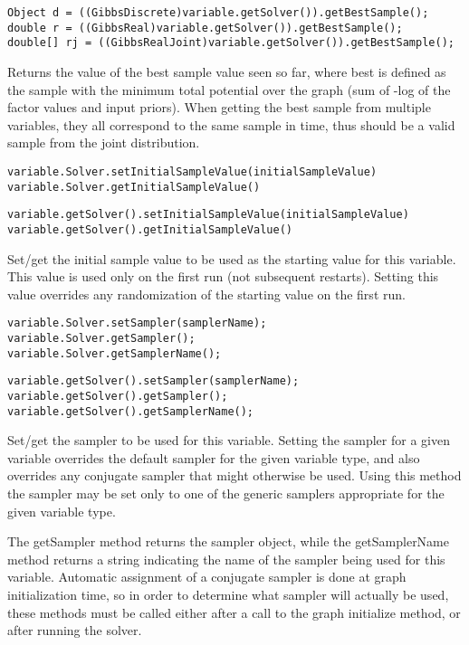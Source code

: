 \ifjava
\begin{lstlisting}
Object d = ((GibbsDiscrete)variable.getSolver()).getBestSample();
double r = ((GibbsReal)variable.getSolver()).getBestSample();
double[] rj = ((GibbsRealJoint)variable.getSolver()).getBestSample();
\end{lstlisting}
\fi


Returns the value of the best sample value seen so far, where best is defined as the sample with the minimum total potential over the graph (sum of -log of the factor values and input priors).  When getting the best sample from multiple variables, they all correspond to the same sample in time, thus should be a valid sample from the joint distribution.

\ifmatlab
\begin{lstlisting}
variable.Solver.setInitialSampleValue(initialSampleValue)
variable.Solver.getInitialSampleValue()
\end{lstlisting}
\fi

\ifjava
\begin{lstlisting}
variable.getSolver().setInitialSampleValue(initialSampleValue)
variable.getSolver().getInitialSampleValue()
\end{lstlisting}
\fi

Set/get the initial sample value to be used as the starting value for this variable.  This value is used only on the first run (not subsequent restarts).  Setting this value overrides any randomization of the starting value on the first run.


\ifmatlab
\begin{lstlisting}
variable.Solver.setSampler(samplerName);
variable.Solver.getSampler();
variable.Solver.getSamplerName();
\end{lstlisting}
\fi

\ifjava
\begin{lstlisting}
variable.getSolver().setSampler(samplerName);
variable.getSolver().getSampler();
variable.getSolver().getSamplerName();
\end{lstlisting}
\fi

Set/get the sampler to be used for this variable.  Setting the sampler for a given variable overrides the default sampler for the given variable type, and also overrides any conjugate sampler that might otherwise be used.  Using this method the sampler may be set only to one of the generic samplers appropriate for the given variable type.

The getSampler method returns the sampler object, while the getSamplerName method returns a string indicating the name of the sampler being used for this variable.  Automatic assignment of a conjugate sampler is done at graph initialization time, so in order to determine what sampler will actually be used, these methods must be called either after a call to the graph initialize method, or after running the solver.

